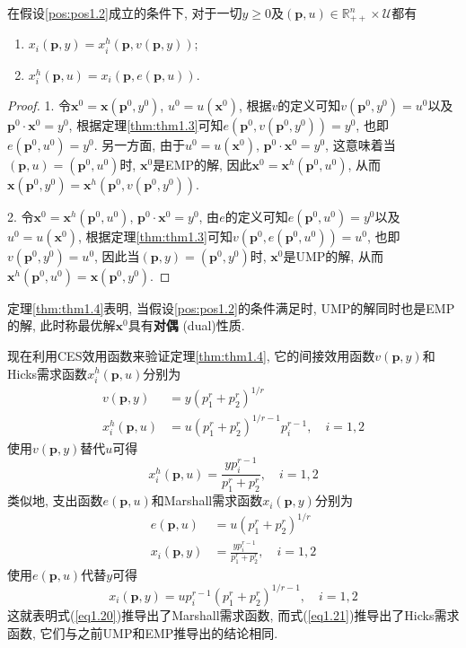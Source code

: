 \documentclass[cn, 12pt, math=mtpro2, bibstyle=apa, blue]{elegantbook}
\newcommand{\R}{\mathbb{R}}
\newcommand{\p}{\mathbf{p}}
\newcommand{\x}{\mathbf{x}}
\begin{document}
\begin{theorem}[对偶关系]\label{thm:thm1.4}
  在假设\ref{pos:pos1.2}成立的条件下, 对于一切$y\ge0$及$(\p,u)\in\R_{++}^n\times\mathcal{U}$都有
  \begin{enumerate}[label=\arabic*.]
    \item $x_i(\p,y)=x_i^h(\p,v(\p,y))$;
    \item $x_i^h(\p,u)=x_i(\p,e(\p,u))$.
  \end{enumerate}
\end{theorem}
\begin{proof}
  1. 令$\x^0=\x(\p^0,y^0)$, $u^0=u(\x^0)$, 根据$v$的定义可知$v(\p^0,y^0)=u^0$以及$\p^0\cdot\x^0=y^0$, 根据定理\ref{thm:thm1.3}可知$e(\p^0,v(\p^0,y^0))=y^0$, 也即$e(\p^0,u^0)=y^0$. 另一方面, 由于$u^0=u(\x^0)$, $\p^0\cdot\x^0=y^0$, 这意味着当$(\p,u)=(\p^0,u^0)$时, $\x^0$是EMP的解, 因此$\x^0=\x^h(\p^0,u^0)$, 从而$\x(\p^0,y^0)=\x^h(\p^0,v(\p^0,y^0))$.

  2. 令$\x^0=\x^h(\p^0,u^0)$, $\p^0\cdot\x^0=y^0$, 由$e$的定义可知$e(\p^0,u^0)=y^0$以及$u^0=u(\x^0)$, 根据定理\ref{thm:thm1.3}可知$v(\p^0,e(\p^0,u^0))=u^0$, 也即$v(\p^0,y^0)=u^0$, 因此当$(\p,y)=(\p^0,y^0)$时, $\x^0$是UMP的解, 从而$\x^h(\p^0,u^0)=\x(\p^0,y^0)$.
\end{proof}
定理\ref{thm:thm1.4}表明, 当假设\ref{pos:pos1.2}的条件满足时, UMP的解同时也是EMP的解, 此时称最优解$\x^0$具有\textbf{对偶} (dual)性质.
\begin{example}
现在利用CES效用函数来验证定理\ref{thm:thm1.4}, 它的间接效用函数$v(\p,y)$和Hicks需求函数$x_i^h(\p,u)$分别为
\begin{align*}
v(\p,y)&=y(p_1^r+p_2^r)^{1/r} \\
 x_i^h(\p,u)&=u(p_1^r+p_2^r)^{1/r-1}p_i^{r-1},\quad i=1,2
\end{align*}
使用$v(\p,y)$替代$u$可得
\begin{equation}\label{eq1.20}
  x_i^h(\p,u)=\frac{yp_i^{r-1}}{p_1^r+p_2^r},\quad i=1,2
\end{equation}
类似地, 支出函数$e(\p,u)$和Marshall需求函数$x_i(\p,y)$分别为
\begin{align*}
e(\p,u)&=u(p_1^r+p_2^r)^{1/r} \\
x_i(\p,y)&=\frac{yp_i^{r-1}}{p_1^r+p_2^r},\quad i=1,2
\end{align*}
使用$e(\p,u)$代替$y$可得
\begin{equation}\label{eq1.21}
  x_i(\p,y)=up_i^{r-1}(p_1^r+p_2^r)^{1/r-1},\quad i=1,2
\end{equation}
这就表明式(\ref{eq1.20})推导出了Marshall需求函数, 而式(\ref{eq1.21})推导出了Hicks需求函数, 它们与之前UMP和EMP推导出的结论相同.
\end{example}
\end{document}
